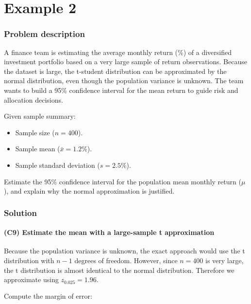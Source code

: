 \chapter{Example 2}\label{sec:interval-example2}

\subsection{Problem description}\label{subsec:interval-example2-problem}

A finance team is estimating the average monthly return (\%) of a diversified investment portfolio based on a very large sample of return observations. Because the dataset is large, the t-student distribution can be approximated by the normal distribution, even though the population variance is unknown. The team wants to build a 95\% confidence interval for the mean return to guide risk and allocation decisions.

Given sample summary:

\begin{itemize}
	\item Sample size (\(n = 400\)).
	\item Sample mean (\(\bar{x} = 1.2\%\)).
	\item Sample standard deviation (\(s = 2.5\%\)).
\end{itemize}

Estimate the 95\% confidence interval for the population mean monthly return (\(\mu\)), and explain why the normal approximation is justified.

\subsection{Solution}\label{subsec:interval-example2-solution}

\subsubsection{(C9) Estimate the mean with a large-sample t approximation}\label{subsubsec:interval-example2-c9}

Because the population variance is unknown, the exact approach would use the t distribution with \(n - 1\) degrees of freedom. However, since \(n = 400\) is very large, the t distribution is almost identical to the normal distribution. Therefore we approximate using \(z_{0.025} = 1.96\).

Compute the margin of error:

